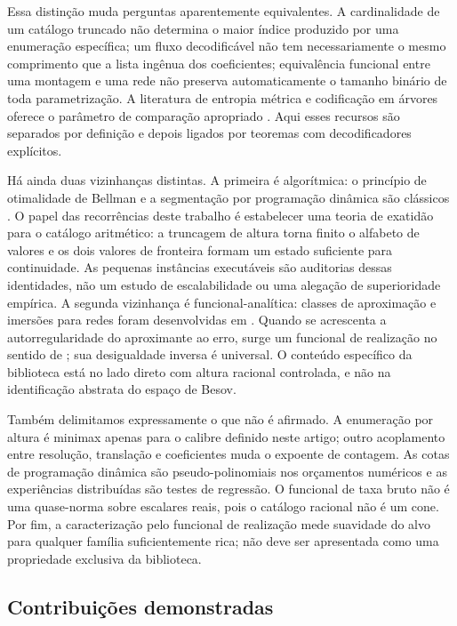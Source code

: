 Essa distinção muda perguntas aparentemente equivalentes. A cardinalidade de
um catálogo truncado não determina o maior índice produzido por uma enumeração
específica; um fluxo decodificável não tem necessariamente o mesmo comprimento
que a lista ingênua dos coeficientes; equivalência funcional entre uma montagem
e uma rede não preserva automaticamente o tamanho binário de toda
parametrização. A literatura de entropia métrica e codificação em árvores
oferece o parâmetro de comparação apropriado
\citep{kolmogorov1959,cohen2001,elias1975,coverthomas2006}. Aqui esses recursos
são separados por definição e depois ligados por teoremas com decodificadores
explícitos.

Há ainda duas vizinhanças distintas. A primeira é algorítmica: o princípio de
otimalidade de Bellman e a segmentação por programação dinâmica são clássicos
\citep{bellman1957,bellman1961,stone1961,perezvidal1994}. O papel das
recorrências deste trabalho é estabelecer uma teoria de exatidão para o
catálogo aritmético: a truncagem de altura torna finito o alfabeto de valores e
os dois valores de fronteira formam um estado suficiente para continuidade.
As pequenas instâncias executáveis são auditorias dessas identidades, não um
estudo de escalabilidade ou uma alegação de superioridade empírica. A segunda
vizinhança é funcional-analítica: classes de aproximação e imersões para redes
foram desenvolvidas em \citet{gribonval2022,grohs2023}. Quando se acrescenta a
autorregularidade do aproximante ao erro, surge um funcional de realização no
sentido de \citet{hristovivanov1990}; sua desigualdade inversa é universal. O
conteúdo específico da biblioteca está no lado direto com altura racional
controlada, e não na identificação abstrata do espaço de Besov.

Também delimitamos expressamente o que não é afirmado. A enumeração por altura
é minimax apenas para o calibre definido neste artigo; outro acoplamento entre
resolução, translação e coeficientes muda o expoente de contagem. As cotas de
programação dinâmica são pseudo-polinomiais nos orçamentos numéricos e as
experiências distribuídas são testes de regressão. O funcional de taxa bruto
não é uma quase-norma sobre escalares reais, pois o catálogo racional não é um
cone. Por fim, a caracterização pelo funcional de realização mede suavidade do
alvo para qualquer família suficientemente rica; não deve ser apresentada como
uma propriedade exclusiva da biblioteca.

\subsection{Contribuições demonstradas}

